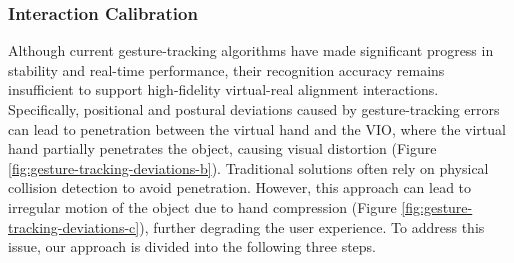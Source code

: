 \subsubsection{Interaction Calibration}
Although current gesture-tracking algorithms have made significant progress in stability and real-time performance, their recognition accuracy remains insufficient to support high-fidelity virtual-real alignment interactions. Specifically, positional and postural deviations caused by gesture-tracking errors can lead to penetration between the virtual hand and the VIO, where the virtual hand partially penetrates the object, causing visual distortion (Figure \ref{fig:gesture-tracking-deviations-b}). Traditional solutions often rely on physical collision detection to avoid penetration. However, this approach can lead to irregular motion of the object due to hand compression (Figure \ref{fig:gesture-tracking-deviations-c}), further degrading the user experience. To address this issue, our approach is divided into the following three steps.

